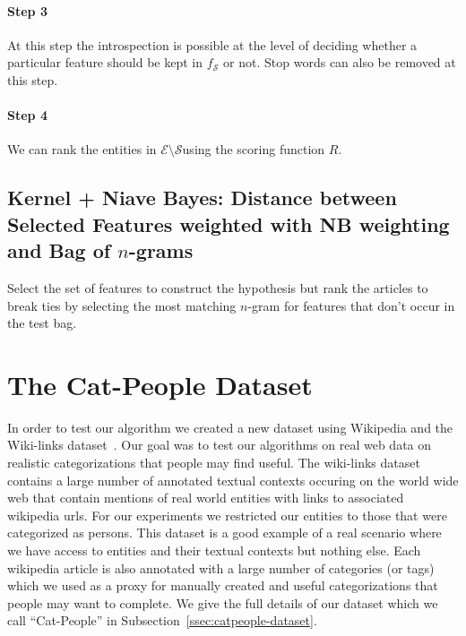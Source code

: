 \documentclass{article}
\newcommand{\ssecref}[1]{Subsection~\ref{#1}}
\newcommand{\ems}{$\mathcal{E} \setminus \mathcal{S}$}
\begin{document}
\paragraph{Step 3}
At this step the introspection is possible at the level of deciding whether a
particular feature should be kept in $f_{\mathcal{S}}$ or not. Stop words can
also be removed at this step.
\paragraph{Step 4}
We can rank the entities in \ems using the scoring function $R$.

\subsection{Kernel + Niave Bayes: Distance between Selected Features weighted
  with NB weighting and Bag of $n$-grams}
\label{sec:kernel-nb}
Select the set of features to construct the hypothesis but rank the articles to
break ties by selecting the most matching $n$-gram for features that don't occur
in the test bag.





\section{The Cat-People Dataset}
\label{sec:cat-people-dataset}
In order to test our algorithm we created a new dataset using Wikipedia and the
Wiki-links dataset~\cite{singh2012wikilinks}. Our goal was to test our
algorithms on real web data on realistic categorizations that people may find
useful. The wiki-links dataset contains a large number of annotated textual contexts
occuring on the world wide web that contain mentions of real world entities with
links to associated wikipedia urls. For our experiments we restricted our
entities to those that were categorized as persons. This dataset is a good example of a real
scenario where we have access to entities and their textual contexts but nothing
else. Each wikipedia article is also annotated with a large number of categories (or
tags) which we used as a proxy for manually created and useful categorizations
that people may want to complete. We give the full details of our dataset which
we call ``Cat-People'' in \ssecref{ssec:catpeople-dataset}.
\end{document}
